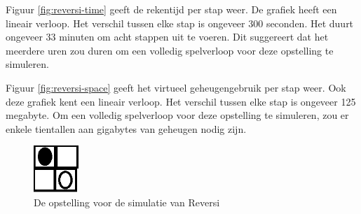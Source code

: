 Figuur \ref{fig:reversi-time} geeft de rekentijd per stap weer. De grafiek heeft een lineair verloop. Het verschil tussen elke stap is ongeveer 300 seconden. Het duurt ongeveer 33 minuten om acht stappen uit te voeren. Dit suggereert dat het meerdere uren zou duren om een volledig spelverloop voor deze opstelling te simuleren.

Figuur \ref{fig:reversi-space} geeft het virtueel geheugengebruik per stap weer. Ook deze grafiek kent een lineair verloop. Het verschil tussen elke stap is ongeveer 125 megabyte. Om een volledig spelverloop voor deze opstelling te simuleren, zou er enkele tientallen aan gigabytes van geheugen nodig zijn.

\begin{figure}
	\centering
	\includegraphics[width=0.15\textwidth]{chap-evaluatie/reversigrid.png}
	\caption{De opstelling voor de simulatie van Reversi}
	\label{fig:reversigrid}
\end{figure}

